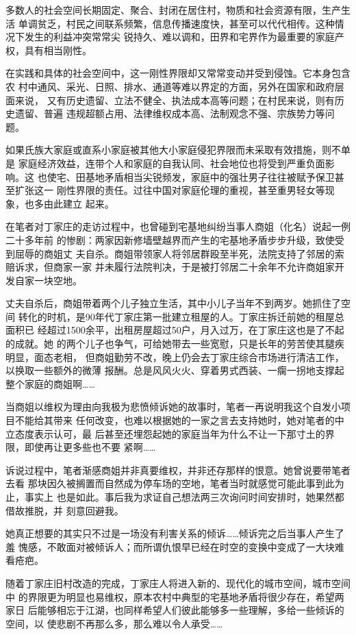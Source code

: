 多数人的社会空间长期固定、聚合、封闭在居住村，物质和社会资源有限，生产生活
单调贫乏，村民之间联系频繁，信息传播速度快，甚至可以代代相传。这种情况下发生的利益冲突常常尖
锐持久、难以调和，田界和宅界作为最重要的家庭产权，具有相当刚性。

在实践和具体的社会空间中，这一刚性界限却又常常变动并受到侵蚀。它本身包含农
村中通风、采光、日照、排水、通道等难以界定的方面，另外在国家和政府层面来说，
又有历史遗留、立法不健全、执法成本高等问题；在村民来说，则有历史遗留、普遍
违规超额占用、法律维权成本高、法制观念不强、宗族势力等问题。

如果氏族大家庭或直系小家庭被其他大小家庭侵犯界限而未采取有效措施，则不单是
家庭经济效益，连带个人和家庭的自我认同、社会地位也将受到严重负面影响。这
也使宅、田基地矛盾相当尖锐频发，家庭中的强壮男子往往被赋予保卫甚至扩张这一
刚性界限的责任。过往中国对家庭伦理的重视，甚至重男轻女等现象，也多由此建立
起来。

在笔者对丁家庄的走访过程中，也曾碰到宅基地纠纷当事人商姐（化名）说起一例二十多年前
的惨剧：两家因新修墙壁越界而产生的宅基地矛盾步步升级，致使受到屈辱的商姐丈
夫自杀。商姐带领家人将邻居群殴至半死，法院支持了邻居的索赔诉求，但商家一家
并未履行法院判决，于是被打邻居二十余年不允许商姐家开发自家一块空地。

丈夫自杀后，商姐带着两个儿子独立生活，其中小儿子当年不到两岁。她抓住了空间
转化的时机，是90年代丁家庄第一批建立租屋的人。丁家庄拆迁前她的租屋总面积已
经超过1500余平，出租房屋超过50户，月入过万，在丁家庄这也是了不起的成就。她
的两个儿子也争气，可给她带去一些宽慰，只是长年的劳苦使其腿疾明显，面态老相，
但商姐勤劳不改，晚上仍会去丁家庄综合市场进行清洁工作，以换取一些额外的微薄
报酬。总是风风火火、穿着男式西装、一瘸一拐地支撑起整个家庭的商姐啊……

当商姐以维权为理由向我极为悲愤倾诉她的故事时，笔者一再说明我这个自发小项目不能给其带来
任何改变，也难以根据她的一家之言去支持她时，她对笔者的中立态度表示认可，最
后甚至还埋怨起她的家庭当年为什么不让一下那寸土的界限，即使再让更多些也不要
紧啊……

诉说过程中，笔者渐感商姐并非真要维权，并非还存那样的恨意。她曾说要带笔者去看
那块因久被搁置而自然成为停车场的空地，笔者当时就感觉可能此事到此为止，事实上
也是如此。事后我为求证自己想法两三次询问时间安排时，她果然都借故推脱，并
刻意回避我。

她真正想要的其实只不过是一场没有利害关系的倾诉……倾诉完之后当事人产生了羞
愧感，不敢面对被倾诉人；而所谓仇恨早已经在时空的变换中变成了一大块难看疮疤。

随着丁家庄旧村改造的完成，丁家庄人将进入新的、现代化的城市空间，城市空间中
的界限更为明显也易维权，原本农村中典型的宅基地矛盾将很少存在，希望两家日
后能够相忘于江湖，也同样希望人们彼此能够多一些理解，多给一些倾诉的空间，以
使悲剧不再那么多，那么难以令人承受……



